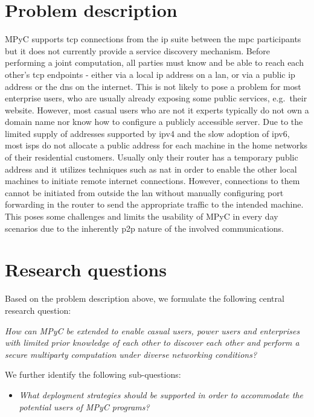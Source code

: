 \hypertarget{problem-description}{%
\section{Problem description}\label{problem-description}}

MPyC supports \gls{tcp} connections from the \gls{ip} suite between the
\gls{mpc} participants but it does not currently provide a service
discovery mechanism. Before performing a joint computation, all parties
must know and be able to reach each other's \gls{tcp} endpoints - either
via a local \gls{ip} address on a \gls{lan}, or via a public \gls{ip}
address or the \gls{dns} on the internet. This is not likely to pose a
problem for most enterprise users, who are usually already exposing some
public services, e.g.~their website. However, most casual users who are
not \gls{it} experts typically do not own a domain name nor know how to
configure a publicly accessible server. Due to the limited supply of
addresses supported by \gls{ip}v4 and the slow adoption of \gls{ip}v6,
most \glspl{isp} do not allocate a public address for each machine in
the home networks of their residential customers. Usually only their
router has a temporary public address and it utilizes techniques such as
\gls{nat} in order to enable the other local machines to initiate remote
internet connections. However, connections to them cannot be initiated
from outside the \gls{lan} without manually configuring port forwarding
in the router to send the appropriate traffic to the intended machine.
This poses some challenges and limits the usability of MPyC in every day
scenarios due to the inherently \gls{p2p} nature of the involved
communications.

\hypertarget{research-questions}{%
\section{Research questions}\label{research-questions}}

Based on the problem description above, we formulate the following
central research question:

\emph{How can MPyC be extended to enable casual users, power users and
enterprises with limited prior knowledge of each other to discover each
other and perform a secure multiparty computation under diverse
networking conditions?}

We further identify the following sub-questions:

\begin{itemize}
\tightlist
\item
  \emph{What deployment strategies should be supported in order to
  accommodate the potential users of MPyC programs?}
\end{itemize}

